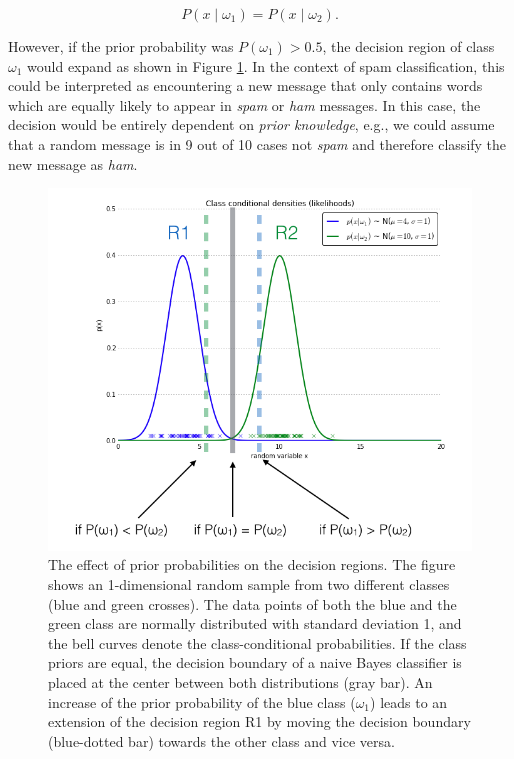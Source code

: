 \documentclass{article}
\begin{document}
\begin{equation}  P(x \mid \omega_1) = P(x \mid \omega_2).\end{equation}

However, if the prior probability was $P(\omega_1) > 0.5$, the decision region of class $\omega_1$ would expand as shown in Figure \ref{fig:effect_priors}. In the context of spam classification, this could be interpreted as encountering a new message that only contains words which are equally likely to appear in \emph{spam} or \emph{ham} messages. In this case, the decision would be entirely dependent on \emph{prior knowledge}, e.g., we could assume that a random message is in 9 out of 10 cases not \emph{spam} and therefore classify the new message as \emph{ham}.



\begin{figure}[h!]
\includegraphics[width=\linewidth]{../images/effect_priors_1.png}
\caption{The effect of prior probabilities on the decision regions. The figure shows an 1-dimensional random sample from two different classes (blue and green crosses). The data points of both the blue and the green class are normally distributed with standard deviation 1, and the bell curves denote the class-conditional probabilities. If the class priors are equal, the decision boundary of a naive Bayes classifier is placed at the center between both distributions (gray bar). An increase of the prior probability of the blue class ($\omega_1$) leads to an extension of the decision region R1 by moving the decision boundary (blue-dotted bar) towards the other class and vice versa.}
\label{fig:effect_priors}
\end{figure}
\end{document}
